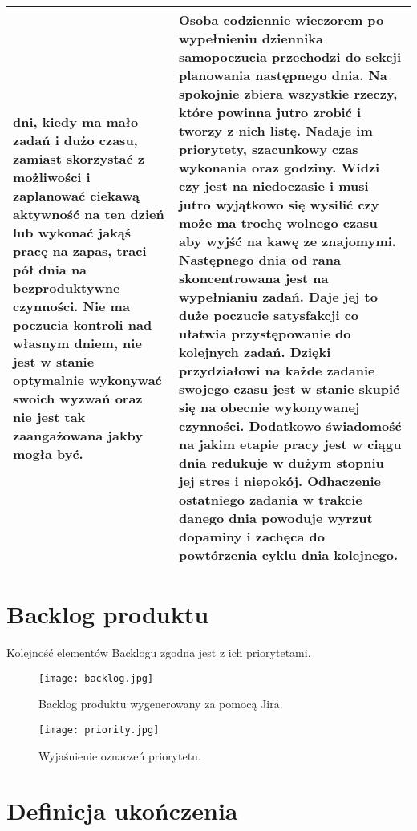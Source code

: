 \documentclass[12pt, letterpaper]{article}
\begin{document}
\begin{center}
\begin{longtable}{ | m{} | m{} | }
            dni, kiedy ma mało zadań i dużo czasu, zamiast skorzystać z
            możliwości i zaplanować ciekawą aktywność na ten dzień lub wykonać
            jakąś pracę na zapas, traci pół dnia na bezproduktywne czynności.
            Nie ma poczucia kontroli nad własnym dniem, nie jest w stanie
            optymalnie wykonywać swoich wyzwań oraz nie jest tak zaangażowana
            jakby mogła być. & Osoba codziennie wieczorem po wypełnieniu
            dziennika samopoczucia przechodzi do sekcji planowania następnego
            dnia. Na spokojnie zbiera wszystkie rzeczy, które powinna jutro
            zrobić i tworzy z nich listę. Nadaje im priorytety, szacunkowy czas
            wykonania oraz godziny. Widzi czy jest na niedoczasie i musi jutro
            wyjątkowo się wysilić czy może ma trochę wolnego czasu aby wyjść na
            kawę ze znajomymi. Następnego dnia od rana skoncentrowana jest na
            wypełnianiu zadań. Daje jej to duże poczucie satysfakcji co ułatwia
            przystępowanie do kolejnych zadań. Dzięki przydziałowi na każde
            zadanie swojego czasu jest w stanie skupić się na obecnie
            wykonywanej czynności. Dodatkowo świadomość na jakim etapie pracy
            jest w ciągu dnia redukuje w dużym stopniu jej stres i niepokój.
            Odhaczenie ostatniego zadania w trakcie danego dnia powoduje wyrzut
            dopaminy i zachęca do powtórzenia cyklu dnia kolejnego. \\
            \hline
        \end{longtable}
    \end{center}


    \section{Backlog produktu}
    Kolejność elementów Backlogu zgodna jest z ich priorytetami.
    \begin{figure}[h]
        \centering
        \texttt{[image: backlog.jpg]}
        \caption{Backlog produktu wygenerowany za pomocą Jira.}
    \end{figure}

    \begin{figure}[h]
        \centering
        \texttt{[image: priority.jpg]}
        \caption{Wyjaśnienie oznaczeń priorytetu.}
    \end{figure}


    \section{Definicja ukończenia}
\end{document}
